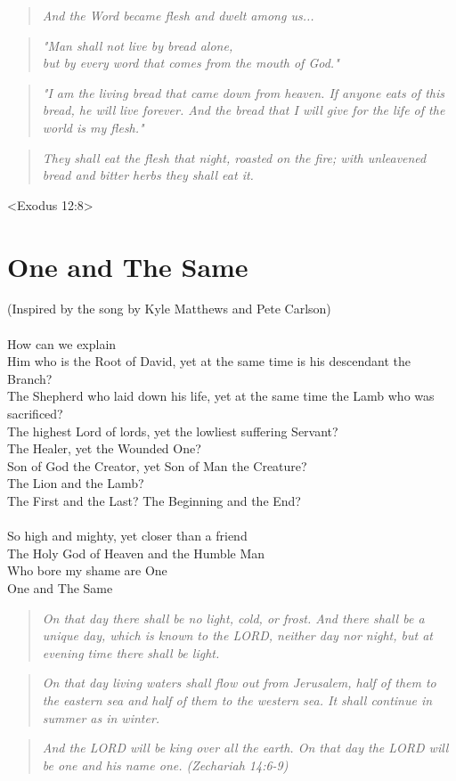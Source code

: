\documentclass[10pt,oneside,footinclude=true,headinclude=true]{scrbook} %
\newcommand\quot[1]{
	\begin{quote}\textit{\small#1}\end{quote}
}
\begin{document}
\quot{And the Word became flesh and dwelt among us...}

\quot{"Man shall not live by bread alone,\\
\hspace*{5mm}but by every word that comes from the mouth of God."}

\quot{"I am the living bread that came down from heaven. If anyone eats of this bread, he will live forever. And the bread that I will give for the life of the world is my flesh."}

\quot{They shall eat the flesh that night, roasted on the fire; with unleavened bread and bitter herbs they shall eat it.}
<Exodus 12:8>


\chapter{One and The Same}
(Inspired by the song by Kyle Matthews and Pete Carlson)\\
\\
How can we explain\\
Him who is the Root of David, yet at the same time is his descendant the Branch?\\
The Shepherd who laid down his life, yet at the same time the Lamb who was sacrificed?\\
The highest Lord of lords, yet the lowliest suffering Servant?\\
The Healer, yet the Wounded One?\\
Son of God the Creator, yet Son of Man the Creature?\\
The Lion and the Lamb?\\
The First and the Last? The Beginning and the End?\\
\\
So high and mighty, yet closer than a friend\\
The Holy God of Heaven and the Humble Man\\
Who bore my shame are One\\
One and The Same\\

\quot{On that day there shall be no light, cold, or frost. And there shall be a unique day, which is known to the LORD, neither day nor night, but at evening time there shall be light.}

\quot{On that day living waters shall flow out from Jerusalem, half of them to the eastern sea and half of them to the western sea. It shall continue in summer as in winter.}

\quot{And the LORD will be king over all the earth. On that day the LORD will be one and his name one. (Zechariah 14:6-9)}
\end{document}
